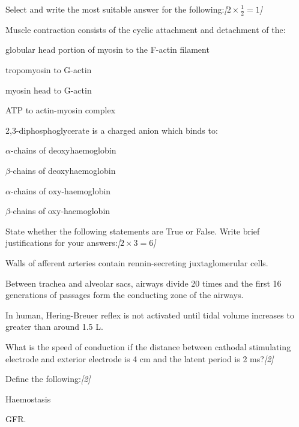 \documentclass[11pt,a4paper]{article}
\newcommand{\pts}[1]{\hfill   \textit{[#1]}}
\begin{document}
\begin{parts}
  \item Select and write the most suitable answer for the following:\pts{$2  \times \frac{1}{2} = 1$}
  
\begin{parts}
    \item Muscle contraction consists of the cyclic attachment and detachment of the:
    
\begin{parts}
      \item globular head portion of myosin to the F-actin filament
      \item tropomyosin to G-actin
      \item myosin head to G-actin
      \item ATP to actin-myosin complex
    \end{parts}

    \item 2,3-diphosphoglycerate is a charged anion which binds to:
    
\begin{parts}
      \item $\alpha$-chains of deoxyhaemoglobin
      \item $\beta$-chains of deoxyhaemoglobin
      \item $\alpha$-chains of oxy-haemoglobin
      \item $\beta$-chains of oxy-haemoglobin
    \end{parts}
  \end{parts}

  \item State whether the following statements are True or False. Write brief justifications for your answers:\pts{$2  \times 3 = 6$}
  
\begin{parts}
    \item Walls of afferent arteries contain rennin-secreting juxtaglomerular cells.
    \item Between trachea and alveolar sacs, airways divide 20 times and the first 16 generations of passages form the conducting zone of the airways.
    \item In human, Hering-Breuer reflex is not activated until tidal volume increases to greater than around 1.5 L.
  \end{parts}

  \item What is the speed of conduction if the distance between cathodal stimulating electrode and exterior electrode is 4 cm and the latent period is 2 ms?\pts{2}

  \item Define the following:\pts{2}
  
\begin{parts}
    \item Haemostasis
    \item GFR.
  \end{parts}
\end{parts}
\end{document}
